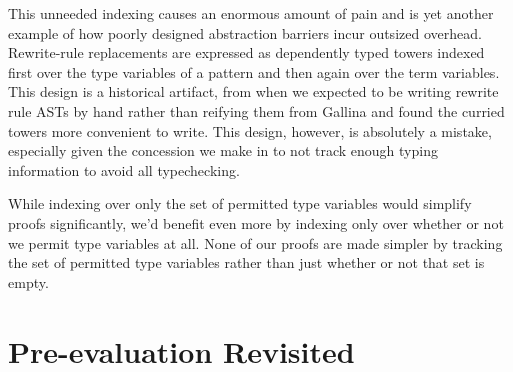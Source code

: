 This unneeded indexing causes an enormous amount of pain and is yet another example of how poorly designed abstraction barriers incur outsized overhead.
Rewrite-rule replacements are expressed as dependently typed towers indexed first over the type variables of a pattern and then again over the term variables.
This design is a historical artifact, from when we expected to be writing rewrite rule ASTs by hand rather than reifying them from Gallina and found the curried towers more convenient to write.
This design, however, is absolutely a mistake, especially given the concession we make in  to not track enough typing information to avoid all typechecking.

While indexing over only the set of permitted type variables would simplify proofs significantly, we'd benefit even more by indexing only over whether or not we permit type variables at all.
None of our proofs are made simpler by tracking the set of permitted type variables rather than just whether or not that set is empty.
%
%
%

\section{Pre-evaluation Revisited}\label{sec:rewriting-more:prereduction-again}

